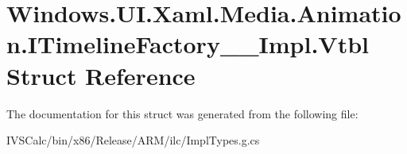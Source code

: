 \hypertarget{struct_windows_1_1_u_i_1_1_xaml_1_1_media_1_1_animation_1_1_i_timeline_factory_____impl_1_1_vtbl}{}\section{Windows.\+U\+I.\+Xaml.\+Media.\+Animation.\+I\+Timeline\+Factory\+\_\+\+\_\+\+Impl.\+Vtbl Struct Reference}
\label{struct_windows_1_1_u_i_1_1_xaml_1_1_media_1_1_animation_1_1_i_timeline_factory_____impl_1_1_vtbl}


The documentation for this struct was generated from the following file\+:\begin{DoxyCompactItemize}
\item 
I\+V\+S\+Calc/bin/x86/\+Release/\+A\+R\+M/ilc/Impl\+Types.\+g.\+cs\end{DoxyCompactItemize}
